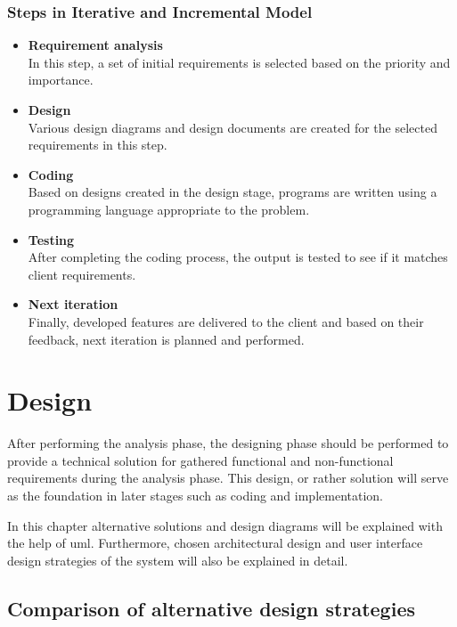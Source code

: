\documentclass[12pt]{report}
\begin{document}
\subsection{Steps in Iterative and Incremental Model}
\begin{itemize}
	\item {\bf{Requirement analysis}}\\
	      In this step, a set of initial requirements is selected based on the priority and importance.

	\item {\bf{Design}}\\
	      Various design diagrams and design documents are created for the selected requirements in this step.

	\item {\bf{Coding}}\\
	      Based on designs created in the design stage, programs are written using a programming language appropriate to the problem.

	\item {\bf{Testing}}\\
	      After completing the coding process, the output is tested to see if it matches client requirements.

	\item {\bf{Next iteration}}\\
	      Finally, developed features are delivered to the client and based on their feedback, next iteration is planned and performed.

\end{itemize}

\newpage
\chapter{Design}
After performing the analysis phase, the designing phase should be performed to provide a technical solution for gathered functional and non-functional requirements during the analysis phase. This design, or rather solution will serve as the foundation in later stages such as coding and implementation.

In this chapter alternative solutions and design diagrams will be explained with the help of \acrshort{uml}. Furthermore, chosen architectural design and user interface design strategies of the system will also be explained in detail.

\section{Comparison of alternative design strategies}
\end{document}
